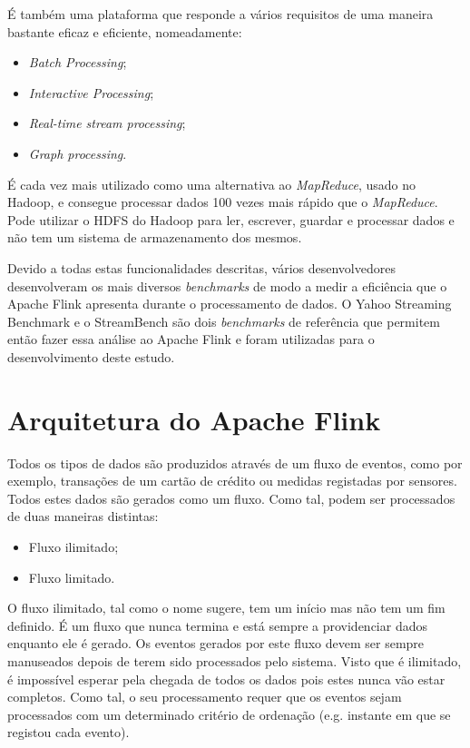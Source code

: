 \documentclass[conference]{IEEEtran}
\begin{document}
É também uma plataforma que responde a vários requisitos de uma maneira bastante eficaz e eficiente, nomeadamente:

\begin{itemize}
    \item \emph{Batch Processing};
    \item \emph{Interactive Processing};
    \item \emph{Real-time stream processing};
    \item \emph{Graph processing}.
\end{itemize}

É cada vez mais utilizado como uma alternativa ao \emph{MapReduce}, usado no Hadoop, e consegue processar dados 100 vezes mais rápido que o \emph{MapReduce}. Pode utilizar o HDFS do Hadoop para ler, escrever, guardar e processar dados e não tem um sistema de armazenamento dos mesmos.

Devido a todas estas funcionalidades descritas, vários desenvolvedores desenvolveram os mais diversos \emph{benchmarks} de modo a medir a eficiência que o Apache Flink apresenta durante o processamento de dados. O Yahoo Streaming Benchmark e o StreamBench são dois \emph{benchmarks} de referência que permitem então fazer essa análise ao Apache Flink e foram utilizadas para o desenvolvimento deste estudo. 

\section{Arquitetura do Apache
Flink}
\label{arquitetura}

Todos os tipos de dados são produzidos através de um fluxo de eventos, como por exemplo, transações de um cartão de crédito ou medidas registadas por sensores. Todos estes dados são gerados como um fluxo. Como tal, podem ser processados de duas maneiras distintas:

\begin{itemize}
    \item Fluxo ilimitado;
    \item Fluxo limitado.
\end{itemize}

O fluxo ilimitado, tal como o nome sugere, tem um início mas não tem um fim definido. É um fluxo que nunca termina e está sempre a providenciar dados enquanto ele é gerado. Os eventos gerados por este fluxo devem ser sempre manuseados depois de terem sido processados pelo sistema. Visto que é ilimitado, é impossível esperar pela chegada de todos os dados pois estes nunca vão estar completos. Como tal, o seu processamento requer que os eventos sejam processados com um determinado critério de ordenação (e.g. instante em que se registou cada evento).
\end{document}
